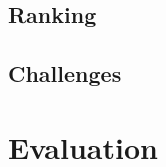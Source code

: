 \documentclass{article}
\begin{document}
\subsection{Ranking}
\subsection{Challenges}

\section{Evaluation}

\end{document}
